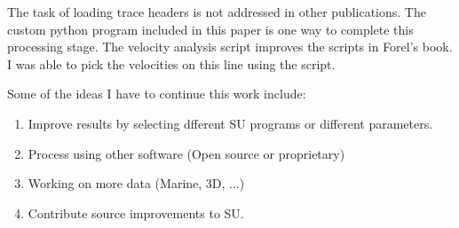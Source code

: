 The task of loading trace headers is not addressed in other
publications.  The custom python program included in this paper is one
way to complete this processing stage.  The velocity analysis script 
improves the scripts in Forel's book.  I was able to pick the velocities 
on this line using the script.

Some of the ideas I have to continue this work include:
\begin{enumerate}
\item Improve results by selecting dfferent SU programs or different 
parameters. 
\item Process using other software (Open source or proprietary)
\item Working on more data (Marine, 3D, ...)
\item Contribute source improvements to SU.
\end{enumerate}




